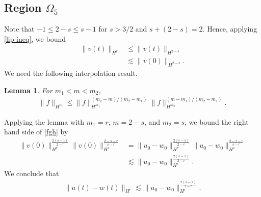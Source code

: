 \documentclass[a0,portrait]{a0poster}
\newtheorem{lemma}[theorem]{Lemma}
\begin{document}
\begin{multicols}{3}
\subsection*{Region $\Omega_{5}$} 
\label{ssec:case-4}
%
%
Note that   $-1 \le 2-s \le s-1$ for $s>3/2$ and $s + (2-s) = 2$.
Hence, applying \eqref{lip-ineq}, we bound 
%
%
%
%
\begin{equation}
  \label{fgh}
\begin{split}
  \| v(t) \|_{H^{r}}
  & \le \|v(t) \|_{H^{2-s}}
  \\
  & \lesssim \|v(0) \|_{H^{2-s}}.
  \end{split}
\end{equation}
%
We need the following interpolation
result. 
%
%
%
%
%
%
%
%
\begin{lemma}
  For $m_{1} < m < m_{2}$,
  \begin{equation*}
  \begin{split}
    \| f \|_{H^{m}} \le \| f \|_{H^{m_{1}}}^{(m_{2}-m)/(m_{2} - m_{1})} \| f
    \|_{H^{m_{2}}}^{(m -m_{1})/(m_{2} - m_{1})}.
  \end{split}
  \end{equation*}
\label{lem:interp}
\end{lemma}
%
Applying the lemma with $m_{1} =r$, $m = 2-s$, and $m_{2} = s$, we bound the
right hand side of \eqref{fgh} by
%
%
\begin{equation*}
\begin{split}
  \| v(0) \|_{H^{r}}^{\frac{2(s-1)}{2-r}} \|v(0)
  \|_{H^{s}}^{\frac{2-s-r}{s-r}}
  & = \| u_{0} - w_{0} \|_{H^{r}}^{\frac{2(s-1)}{2-r}} \|u_{0} - w_{0}
  \|_{H^{s}}^{\frac{2-s-r}{s-r}}
  \\
  & \lesssim \| u_{0} - w_{0} \|_{H^{r}}^{\frac{2(s-1)}{2-r}}.
\end{split}
\end{equation*}
%
We conclude that
%
%
\begin{equation*}
\begin{split}
  \| u(t) - w(t) \|_{H^{r}} \lesssim \|u_{0} - w_{0} \|_{H^{r}}^{\frac{2(s-1)}{2-r}}.
\end{split}
\end{equation*}
%
%
%
%

\end{multicols}
\end{document}

